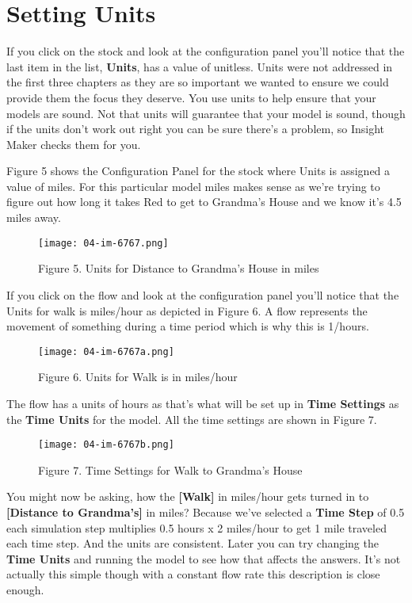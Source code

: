 \documentclass[]{memoir}
\let\Oldincludegraphics\includegraphics
\renewcommand{\includegraphics}[1]{\Oldincludegraphics[max size={\textwidth}{\textheight}]{#1}}
\newcommand{\p}[1]{\textbf{{[}#1{]}}}
\renewcommand{\u}[1]{\textbf{#1}}
\renewcommand{\a}[1]{\textbf{#1}}
\begin{document}
\section{Setting Units}

If you click on the stock and look at the configuration panel you'll
notice that the last item in the list, \a{Units}, has a value of
unitless. Units were not addressed in the first three chapters as they
are so important we wanted to ensure we could provide them the focus
they deserve. You use units to help ensure that your models are sound.
Not that units will guarantee that your model is sound, though if the
units don't work out right you can be sure there's a problem, so Insight
Maker checks them for you.

Figure 5 shows the Configuration Panel for the stock where Units is
assigned a value of miles. For this particular model miles makes sense
as we're trying to figure out how long it takes Red to get to Grandma's
House and we know it's 4.5 miles away.

\begin{figure}[htbp]
\centering
\texttt{[image: 04-im-6767.png]}
\caption{Figure 5. Units for Distance to Grandma's House in miles}
\end{figure}

If you click on the flow and look at the configuration panel you'll
notice that the Units for walk is miles/hour as depicted in Figure 6. A
flow represents the movement of something during a time period which is
why this is 1/hours.

\begin{figure}[htbp]
\centering
\texttt{[image: 04-im-6767a.png]}
\caption{Figure 6. Units for Walk is in miles/hour}
\end{figure}

The flow has a units of hours as that's what will be set up in
\u{Time Settings} as the \u{Time Units} for the model. All the time
settings are shown in Figure 7.

\begin{figure}[htbp]
\centering
\texttt{[image: 04-im-6767b.png]}
\caption{Figure 7. Time Settings for Walk to Grandma's House}
\end{figure}

You might now be asking, how the \p{Walk} in miles/hour gets turned in
to \p{Distance to Grandma's} in miles? Because we've selected a
\a{Time Step} of 0.5 each simulation step multiplies 0.5 hours x 2
miles/hour to get 1 mile traveled each time step. And the units are
consistent. Later you can try changing the \u{Time Units} and running
the model to see how that affects the answers. It's not actually this
simple though with a constant flow rate this description is close
enough.
\end{document}
